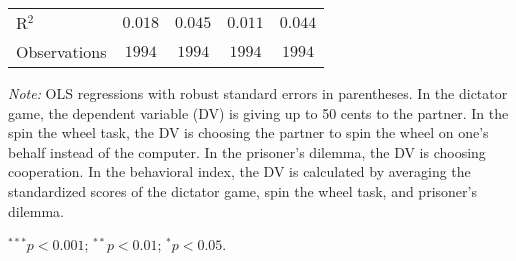 \begin{table}[!t]
\begin{center}
{\begin{threeparttable}
\begin{tabular}{l c c c c}
R$^2$                                            & $0.018$        & $0.045$        & $0.011$        & $0.044$        \\
Observations                                     & $1994$         & $1994$         & $1994$         & $1994$         \\
\bottomrule
\end{tabular}
\begin{tablenotes}[flushleft]
\scriptsize{\item[\hspace{-5mm}] \textit{Note:} OLS regressions with robust standard errors in parentheses. 
                                In the dictator game, the dependent variable (DV) is giving up to 50 cents to the partner. 
                                In the spin the wheel task, the DV is choosing the partner to spin the wheel on one’s behalf instead of the computer. 
                                In the prisoner’s dilemma, the DV is choosing cooperation. 
                                In the behavioral index, the DV is calculated by averaging the standardized scores of the dictator game, spin the wheel task, and prisoner's dilemma. \item[\hspace{-5mm}] $^{***}p<0.001$; $^{**}p<0.01$; $^{*}p<0.05$.}
\end{tablenotes}
\end{threeparttable}
}
\label{tab:behavior_regression}
\end{center}
\end{table}

\renewcommand{\baselinestretch}{1.67}%

